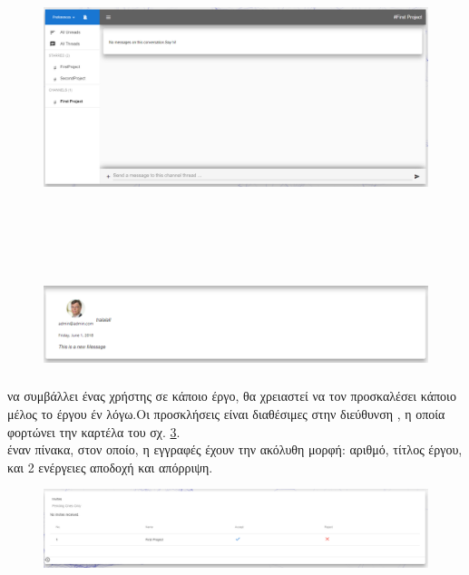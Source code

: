 \begin{figure}[!htb]
\includegraphics[width=\columnwidth, height=10cm]{images/userChat.png}
\caption{}
\label{fig:userChat}
\end{figure}

\begin{figure}[!htb]
\centering
\includegraphics[width=\linewidth]{images/userChatMessage.png}
\caption{}
\label{fig:userChatMessage}
\end{figure}

\subsubsection*{}
 να συμβάλλει ένας χρήστης σε κάποιο έργο, θα χρειαστεί να τον προσκαλέσει κάποιο μέλος το έργου έν λόγω.Οι προσκλήσεις είναι διαθέσιμες στην διεύθυνση , η οποία φορτώνει την καρτέλα του σχ. \ref{fig:userInvites}.\\
 έναν πίνακα, στον οποίο, η εγγραφές έχουν την ακόλυθη μορφή: αριθμό, τίτλος έργου, και 2 ενέργειες αποδοχή και απόρριψη.

\begin{figure}[!htb]
\includegraphics[width=\linewidth]{images/userInvite.png}
\caption{}
\label{fig:userInvites}
\end{figure}

